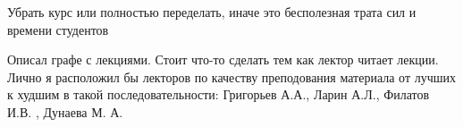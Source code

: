         \begin{commentbox}
			Убрать курс или полностью переделать, иначе это бесполезная трата сил и времени студентов
		\end{commentbox}

        \begin{commentbox}
            Описал  графе с лекциями. Стоит что-то сделать тем как лектор читает лекции. Лично я расположил бы лекторов по качеству преподования материала от лучших к худшим в такой последовательности: Григорьев А.А., Ларин А.Л., Филатов И.В. , Дунаева М. А.
        \end{commentbox}
